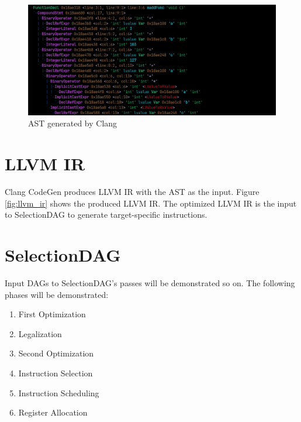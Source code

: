 \begin{figure}
    \centering
    \includegraphics[width=\textwidth]{path_instruction/madd_clang_ast_cropped.png}
    \caption{AST generated by Clang}
    \label{fig:clang_ast}
\end{figure}


\section{LLVM IR}
Clang CodeGen produces LLVM IR with the AST as the input. Figure \ref{fig:llvm_ir} shows the produced LLVM IR. The optimized LLVM IR is the input to SelectionDAG to generate target-specific instructions.  



\section{SelectionDAG}
 Input DAGs to SelectionDAG's passes will be demonstrated so on. The following phases will be demonstrated:
\begin{enumerate}
    \item First Optimization
    \item Legalization
    \item Second Optimization
    \item Instruction Selection
    \item Instruction Scheduling 
    \item Register Allocation
\end{enumerate}


